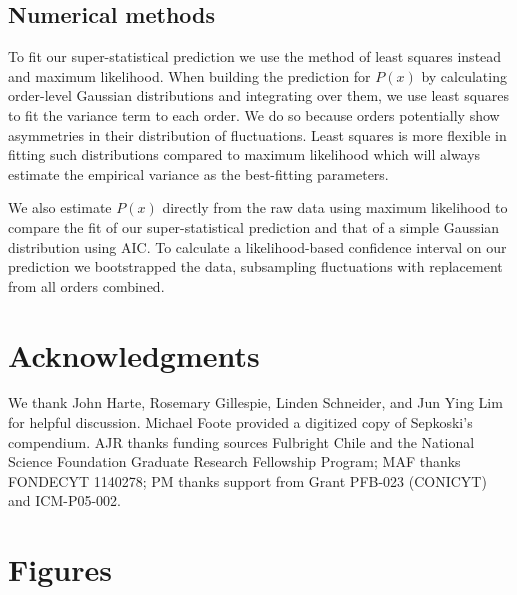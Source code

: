 \documentclass[12pt]{article}
\begin{document}
\subsection*{Numerical methods} \label{sec:numMeth} To fit our
super-statistical prediction we use the method of least squares
instead and maximum likelihood. When building the prediction for
$P(x)$ by calculating order-level Gaussian distributions and
integrating over them, we use least squares to fit the variance term
to each order. We do so because orders potentially show asymmetries in
their distribution of fluctuations. Least squares is more flexible in
fitting such distributions compared to maximum likelihood which will
always estimate the empirical variance as the best-fitting parameters.

We also estimate $P(x)$ directly from the raw data using maximum
likelihood to compare the fit of our super-statistical prediction and
that of a simple Gaussian distribution using AIC. To calculate a
likelihood-based confidence interval on our prediction we bootstrapped
the data, subsampling fluctuations with replacement from all orders
combined.

\section*{Acknowledgments}
We thank John Harte, Rosemary Gillespie, Linden Schneider, and Jun
Ying Lim for helpful discussion. Michael Foote provided a digitized
copy of Sepkoski's compendium. AJR thanks funding sources Fulbright
Chile and the National Science Foundation Graduate Research Fellowship
Program; MAF thanks FONDECYT 1140278; PM thanks support from Grant
PFB-023 (CONICYT) and ICM-P05-002.

\printbibliography

\clearpage

\section*{Figures}
\end{document}
